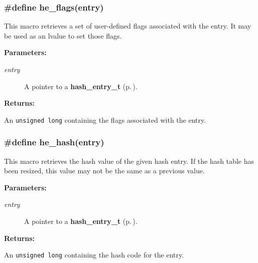 \subsubsection{\setlength{\rightskip}{0pt plus 5cm}\#define he\_\-flags(entry)}\label{group__dbprim__hash_a32}




 This macro retrieves a set of user-defined flags associated with the entry. It may be used as an lvalue to set those flags.\begin{Desc}
\item[{\bf Parameters: }]\par
\begin{description}
\item[
{\em entry}]A pointer to a {\bf hash\_\-entry\_\-t} {\rm (p.\,\pageref{group__dbprim__hash_a1})}.

\end{description}
\end{Desc}
\begin{Desc}
\item[{\bf Returns: }]\par
An {\tt unsigned long} containing the flags associated with the entry. \end{Desc}
\subsubsection{\setlength{\rightskip}{0pt plus 5cm}\#define he\_\-hash(entry)}\label{group__dbprim__hash_a34}




 This macro retrieves the hash value of the given hash entry. If the hash table has been resized, this value may not be the same as a previous value.\begin{Desc}
\item[{\bf Parameters: }]\par
\begin{description}
\item[
{\em entry}]A pointer to a {\bf hash\_\-entry\_\-t} {\rm (p.\,\pageref{group__dbprim__hash_a1})}.

\end{description}
\end{Desc}
\begin{Desc}
\item[{\bf Returns: }]\par
An {\tt unsigned long} containing the hash code for the entry. \end{Desc}
